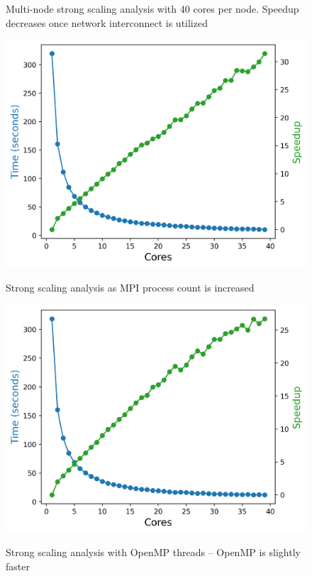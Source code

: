 \begin{figure}[h]
\begin{minipage}{0.45\linewidth}
      \caption{Multi-node strong scaling analysis with 40 cores per node. Speedup decreases once network interconnect is utilized}
        \label{mpi_strong_multinode}
    \end{minipage}
  \begin{minipage}{0.45\linewidth}
      \includegraphics[width=\linewidth]{figs/mpi_strong.out}
	  \caption{Strong scaling analysis as MPI process count is increased}
      \label{fig:mpi_strong}
    \end{minipage}
  \hspace{.05\linewidth}
 \begin{minipage}{0.45\linewidth}
  \includegraphics[width=\linewidth]{figs/omp_strong.out}
  \caption{Strong scaling analysis with OpenMP threads -- OpenMP is slightly faster}
    \label{fig:omp_strong}
    \end{minipage}
\end{figure}

